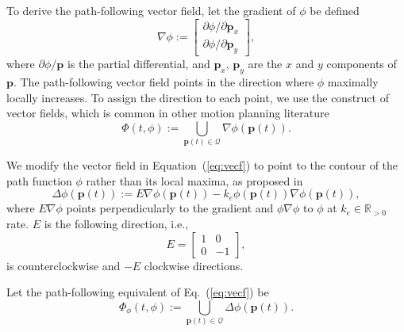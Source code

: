 \documentclass[letterpaper,10pt,conference,twoside]{IEEEtran}
\theoremstyle{definition}
\begin{document}
To derive the path-following vector field, let the gradient of $\phi$ be defined
\begin{equation}
  \nabla\phi:=\begin{bmatrix}
    \partial\phi%
    /\partial\mathbf{p}_x\\
    \partial\phi%
    /\partial\mathbf{p}_y
  \end{bmatrix},
\end{equation}
where $\partial\phi/\mathbf{p}$ is the partial differential, and $\mathbf{p}_x$, $\mathbf{p}_y$ are the $x$ and $y$ components of $\mathbf{p}$.
The path-following vector field points in the direction where $\phi$ maximally locally increases. To assign the direction to each point, we use the construct of vector fields, which is common in other motion planning literature~\cite{%
garcia2017guidance,goncalves2010vector}
\begin{equation}\label{eq:vecf}
  \Phi(t,\phi):={\textstyle \bigcup\limits_{\mathbf{p}(t)\in\mathcal{Q}}}\nabla\phi(\mathbf{p}(t)).
\end{equation}

We modify the vector field in Equation~(\ref{eq:vecf}) to point to the contour of the path function $\phi$ rather than its local maxima, as proposed in~\cite{garcia2017guidance}
\begin{equation}\label{eq:pfvf}
  \Delta\phi(\mathbf{p}(t)):=E\nabla\phi(\mathbf{p}(t))-k_e\phi(\mathbf{p}(t))\nabla\phi(\mathbf{p}(t)),
\end{equation}
where $E\nabla\phi$ points perpendicularly to the gradient and $\phi\nabla\phi$ to $\phi$ at $k_e\in\mathbb{R}_{>0}$ rate. $E$ is the following direction, i.e.,
\begin{equation}
  E=\begin{bmatrix}
    1 & 0\\ 0 & -1
  \end{bmatrix},
\end{equation}
is counterclockwise and $-E$ clockwise directions.%

Let the path-following equivalent of Eq.~(\ref{eq:vecf}) be 
\begin{equation}
  \Phi_\phi(t,\phi):={\textstyle \bigcup\limits_{\mathbf{p}(t)\in\mathcal{Q}}}\Delta\phi(\mathbf{p}(t)).
\end{equation}
\end{document}

